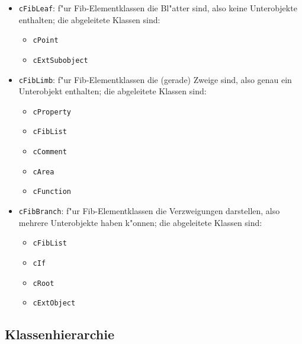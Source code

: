 \begin{itemize}
 \item \verb|cFibLeaf|: f"ur Fib-Elementklassen die Bl"atter sind, also keine Unterobjekte enthalten; die abgeleitete Klassen sind:
 \begin{itemize}
  \item \verb|cPoint|
  \item \verb|cExtSubobject|
 \end{itemize}
 \item \verb|cFibLimb|: f"ur Fib-Elementklassen die (gerade) Zweige sind, also genau ein Unterobjekt enthalten; die abgeleitete Klassen sind:
 \begin{itemize}
  \item \verb|cProperty|
  \item \verb|cFibList|
  \item \verb|cComment|
  \item \verb|cArea|
  \item \verb|cFunction|
 \end{itemize}
 \item \verb|cFibBranch|: f"ur Fib-Elementklassen die Verzweigungen darstellen, also mehrere Unterobjekte haben k"onnen; die abgeleitete Klassen sind:
 \begin{itemize}
  \item \verb|cFibList|
  \item \verb|cIf|
  \item \verb|cRoot|
  \item \verb|cExtObject|
 \end{itemize}
\end{itemize}

\subsection{Klassenhierarchie}

